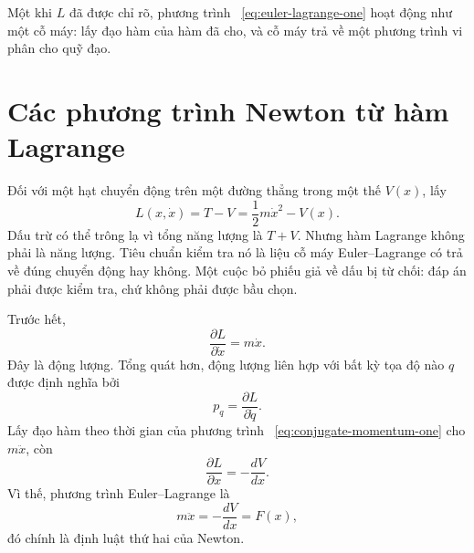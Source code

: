 Một khi \(L\) đã được chỉ rõ, phương trình ~\eqref{eq:euler-lagrange-one} hoạt động như một cỗ máy: lấy đạo hàm của hàm đã cho, và cỗ máy trả về một phương trình vi phân cho quỹ đạo.

\begin{classroomqa}
\end{classroomqa}

\section{Các phương trình Newton từ hàm Lagrange}

Đối với một hạt chuyển động trên một đường thẳng trong một thế \(V(x)\), lấy
\begin{equation}
  L(x,\dot x)=T-V
  =\frac12m\dot x^2-V(x).
  \label{eq:lagrangian-tv-one}
\end{equation}
Dấu trừ có thể trông lạ vì tổng năng lượng là \(T+V\). Nhưng hàm Lagrange không phải là năng lượng. Tiêu chuẩn kiểm tra nó là liệu cỗ máy Euler--Lagrange có trả về đúng chuyển động hay không. Một cuộc bỏ phiếu giả về dấu bị từ chối: đáp án phải được kiểm tra, chứ không phải được bầu chọn.

Trước hết,
\begin{equation}
  \frac{\partial L}{\partial\dot x}=m\dot x.
  \label{eq:conjugate-momentum-one}
\end{equation}
Đây là động lượng. Tổng quát hơn, động lượng liên hợp với bất kỳ tọa độ nào \(q\) được định nghĩa bởi
\begin{equation}
  p_q=\frac{\partial L}{\partial\dot q}.
  \label{eq:conjugate-momentum-general}
\end{equation}
Lấy đạo hàm theo thời gian của phương trình ~\eqref{eq:conjugate-momentum-one} cho \(m\ddot x\), còn
\begin{equation}
  \frac{\partial L}{\partial x}
  =-\frac{dV}{dx}.
  \label{eq:lagrangian-position-derivative}
\end{equation}
Vì thế, phương trình Euler--Lagrange là
\begin{equation}
  m\ddot x=-\frac{dV}{dx}=F(x),
  \label{eq:newton-from-action}
\end{equation}
đó chính là định luật thứ hai của Newton.

